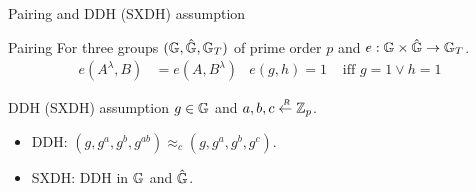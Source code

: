 \begin{frame}{Pairing and DDH (SXDH) assumption}
  \begin{block}{Pairing}
    For three groups $(\mathbb{G}, \hat{\mathbb{G}}, \mathbb{G}_T)$ of prime order $p$ and $e: \mathbb{G} \times \hat{\mathbb{G}} \to \mathbb{G}_T$.
    \begin{align*}
      e(A^{\lambda}, B) &= e(A, B^{\lambda}) & e(g,h) = 1 &\mbox{ iff } g=1 \vee h=1 
    \end{align*}
  \end{block}
  \pause
  \begin{block}{DDH (SXDH) assumption}
    $g \in \mathbb{G}$ and $a,b,c \stackrel{{\scriptscriptstyle \mkern4mu R}}{\gets} \mathbb{Z}_p$.
 
    \begin{itemize}
    \item DDH: $(g,g^a, g^b, g^{ab}) \approx_c (g, g^a, g^b, g^c)$.
 
    \item SXDH: DDH in $\mathbb{G}$ and $\hat{\mathbb{G}}$.
    \end{itemize}
  \end{block}
 
\end{frame}
